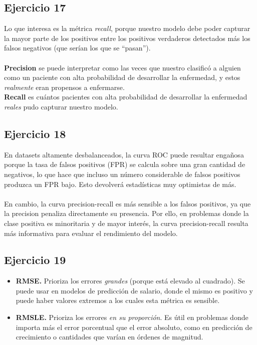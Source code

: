 \documentclass[a4paper,12pt]{article}
\begin{document}
        \subsection*{Ejercicio 17}
            \noindent Lo que interesa es la métrica \emph{recall}, porque nuestro modelo debe poder capturar la mayor parte de los positivos entre los positivos verdaderos detectados más los falsos negativos (que serían los que se ``pasan''). \\
            \\
            \noindent \textbf{Precision} se puede interpretar como las veces que nuestro clasificó a alguien como un paciente con alta probabilidad de desarrollar la enfermedad, y estos \emph{realmente} eran propensos a enfermarse. \\
            \textbf{Recall} es cuántos pacientes con alta probabilidad de desarrollar la enfermedad \emph{reales} pudo capturar nuestro modelo.
        \subsection*{Ejercicio 18}
            \noindent En datasets altamente desbalanceados, la curva ROC puede resultar engañosa porque la tasa de falsos positivos (FPR) se calcula sobre una gran cantidad de negativos, lo que hace que incluso un número considerable de falsos positivos produzca un FPR bajo. Esto devolverá estadísticas muy optimistas de más. \\
            \\
            \noindent En cambio, la curva precision-recall es más sensible a los falsos positivos, ya que la precision penaliza directamente su presencia. Por ello, en problemas donde la clase positiva es minoritaria y de mayor interés, la curva precision-recall resulta más informativa para evaluar el rendimiento del modelo.
        \subsection*{Ejercicio 19}
            \begin{itemize} 
                \item \textbf{RMSE.} Prioriza los errores \emph{grandes} (porque está elevado al cuadrado). Se puede usar en modelos de predicción de salario, donde el mismo es positivo y puede haber valores extremos a los cuales esta métrica es sensible.
                \item \textbf{RMSLE.} Prioriza los errores \emph{en su proporción}. Es útil en problemas donde importa más el error porcentual que el error absoluto, como en predicción de crecimiento o cantidades que varían en órdenes de magnitud.
            \end{itemize}
\end{document}
